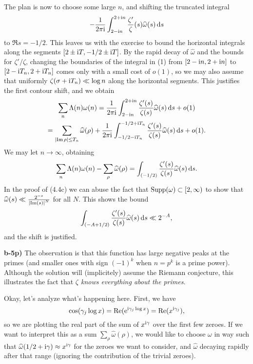 \documentclass[a4paper,11pt]{article}
\begin{document}
    The plan is now to choose some large $n$, and 
    shifting the truncated integral 
    \begin{equation}
        -\frac{1}{2 \pi \mathrm i} \int_{2-\mathrm i n}^{2+ \mathrm i n} \frac{\zeta'}{\zeta}(s) \widehat \omega(s)
        \mathrm{\,d} s
    \end{equation}
    to $\Re s = -1/2$. This leaves us with the exercise to bound the horizontal
    integrals along the segments $[2\pm \mathrm i T, -1/2 \pm \mathrm i T]$. By the rapid decay
    of $\hat \omega$ and the bounds for $\zeta'/\zeta$, changing the boundaries
    of the integral in (1) from $[2-\mathrm i n, 2 + \mathrm i n]$ to $[2 - \mathrm i T_n, 2 +
    \mathrm i T_n]$ comes only with a small cost of $o(1)$, so we may also assume that
    uniformly $\zeta(\sigma + \mathrm i T_n) \ll \log n$ along the horizontal segments. 
    This justifies the first contour shift, and we obtain
    \begin{multline*}
        \sum_n \Lambda(n) \omega(n) = \frac{1}{2 \pi \mathrm i} \int_{2- \mathrm i n}^{2 + \mathrm i n} 
        \frac{\zeta'(s)}{\zeta(s)} \widehat \omega(s) \mathrm{\,d} s + o(1) \\
        = \sum_{\left\lvert \operatorname{Im} \rho \right\rvert \leq T_n} \widehat \omega(\rho)
        + \frac{1}{2 \pi \mathrm i} \int_{-1/2 - \mathrm i T_n}^{-1/2 + \mathrm i T_n}
        \frac{\zeta'(s)}{\zeta(s)} \widehat \omega(s) \mathrm{\,d} s + o(1).
    \end{multline*}
    We may let $n \to \infty$, obtaining 
    \[
        \sum_n \Lambda(n) \omega(n) - \sum_\rho \widehat \omega(\rho)
         = \int_{(-1/2)}  \frac{\zeta'(s)}{\zeta(s)} \widehat \omega(s) \mathrm{\,d} s.
    \]
    In the proof of (4.4c) we can abuse the fact that $\operatorname{Supp}(\omega) \subset
    [2, \infty)$ to show that $\widehat \omega(s) \ll \frac{2^{-s}}{\left\lvert \operatorname{Im}(s) \right\rvert^N}$
    for all $N$. This shows the bound
    \[
        \int_{(-A+1/2)}  \frac{\zeta'(s)}{\zeta(s)} \widehat \omega(s) \mathrm{\,d} s
        \ll 2^{-A},
    \]
    and the shift is justified.

\textbf{b-5p)}
The observation is that this function has large negative peaks at the primes
(and smaller ones with sign $(-1)^k$ when $n=p^k$ is a prime power). Although 
the solution will (implicitely) assume the Riemann conjecture, this illustrates
the fact that \textit{$\zeta$ knows everything about the primes.}

Okay, let's analyze what's happening here. First, we have 
\[
    \cos(\gamma_j \log x) = \operatorname{Re}(\mathrm e^{\mathrm i \gamma_j \log x}) = \operatorname{Re}(x^{\mathrm i \gamma_j}),
\]
so we are plotting the real part of the sum of $x^{\mathrm i \gamma}$ over the first few
zeroes. If we want to interpret this as a sum $\sum_\rho \hat \omega(\rho)$, 
we would like to choose $\omega$ in way such that $\widehat \omega(1/2 + \mathrm i \gamma)
\approx x^{\mathrm i \gamma}$ for the zeroes we want to consider, and $\hat \omega$ 
decaying rapidly after that range (ignoring the contribution of the trivial zeroes).
\end{document}
